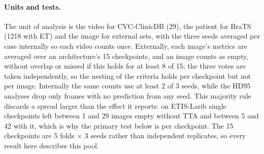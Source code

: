 \paragraph{Units and tests.} The unit of analysis is the video for CVC-ClinicDB (29), the patient for BraTS (1218 with ET) and the image for external sets, with the three seeds averaged per case internally so each video counts once. Externally, each image's metrics are averaged over an architecture's 15 checkpoints, and an image counts as empty, without overlap or missed if this holds for at least 8 of 15; the three votes are taken independently, so the nesting of the criteria holds per checkpoint but not per image. Internally the same counts use at least 2 of 3 seeds, while the HD95 analyses drop only frames with no prediction from any seed. This majority rule discards a spread larger than the effect it reports: on ETIS-Larib single checkpoints left between 1 and 29 images empty without TTA and between 5 and 42 with it, which is why the primary test below is per checkpoint. The 15 checkpoints are 5 folds $\times$ 3 seeds rather than independent replicates, so every result here describes this pool.

